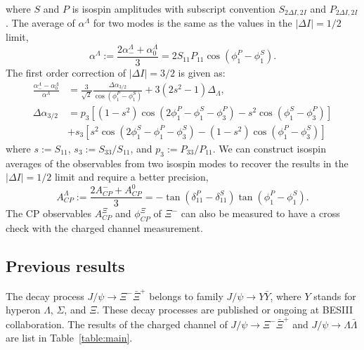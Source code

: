 where $S$ and $P$ is isospin amplitudes with subscript convention 
$S_{2\Delta I, 2I}$ and $P_{2\Delta I, 2I}$. The average of $\alpha^{\Lambda}$ 
for two modes is the same as the values in the $|\Delta I| = 1/2$ limit,
\begin{equation}
	\alpha^{\Lambda} := \frac{2\alpha^{\Lambda}_{-} + \alpha^{\Lambda}_{0}}{3} = 2 S_{11} P_{11} \cos(\phi_{1}^P - \phi_1^S).
\end{equation}
The first order correction of $|\Delta I| = 3/2$ is given as:
\begin{equation}
	\begin{aligned}
		\frac{\alpha_{-}^{\Lambda}-\alpha_{0}^{\Lambda}}{\alpha^{\Lambda}}&=\frac{3}{\sqrt{2}} \frac{\Delta \alpha_{3 / 2}}{\cos \left(\phi_{1}^{P}-\phi_{1}^{S}\right)}+3\left(2 s^{2}-1\right) \Delta_{\Lambda}, \\
\Delta \alpha_{3 / 2} &=p_{3}\left[\left(1-s^{2}\right) \cos \left(2 \phi_{1}^{P}-\phi_{1}^{S}-\phi_{3}^{P}\right)-s^{2} \cos \left(\phi_{1}^{S}-\phi_{3}^{P}\right)\right] \\ 
		&+s_{3}\left[s^{2} \cos \left(2 \phi_{1}^{S}-\phi_{1}^{P}-\phi_{3}^{S}\right)-\left(1-s^{2}\right) \cos \left(\phi_{1}^{P}-\phi_{3}^{S}\right)\right] 
	\end{aligned}
\end{equation}
where $s:= S_{11}$, $s_3 := S_{33}/S_{11}$, and $p_3 := P_{33}/P_{11}$. 
We can construct isospin averages of the observables from two isospin modes
to recover the results in the $|\Delta I| = 1/2$ limit and require a better 
precision,
\begin{equation}
	A^{\Lambda}_{CP} := \frac{2 A^-_{CP} + A^0_{CP}}{3} = - \tan (\delta^P_{11} - \delta^S_{11}) \tan (\phi^P_1 - \phi^S_1).
\end{equation}
The CP observables $A^{\Xi}_{CP}$ and $\phi_{CP}^{\Xi}$ of $\Xi^-$ can also be measured to have a cross check with
the charged channel measurement.



\subsection{Previous results}

The decay process $J/\psi \to \Xi^-\bar{\Xi}^+$ belongs to family $J/\psi\to Y\bar{Y}$, where $Y$ 
stands for hyperon $\Lambda$, $\Sigma$, and $\Xi$. These decay processes are published
 or ongoing at BESIII collaboration. The results of the charged channel of $J/\psi \to \Xi^-\bar{\Xi}^+$
 and $J/\psi \to \Lambda \bar{\Lambda}$ are list in Table~\ref{table:main}.



